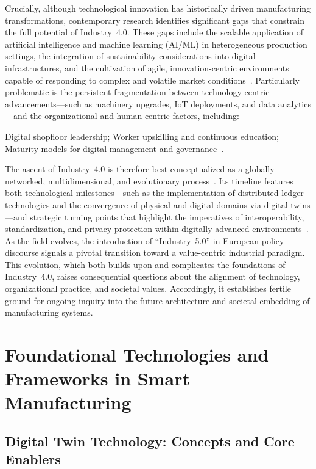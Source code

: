\documentclass[sigconf]{acmart}
\begin{document}
Crucially, although technological innovation has historically driven manufacturing transformations, contemporary research identifies significant gaps that constrain the full potential of Industry~4.0. These gaps include the scalable application of artificial intelligence and machine learning (AI/ML) in heterogeneous production settings, the integration of sustainability considerations into digital infrastructures, and the cultivation of agile, innovation-centric environments capable of responding to complex and volatile market conditions~\cite{ref41,ref63,ref86}. Particularly problematic is the persistent fragmentation between technology-centric advancements---such as machinery upgrades, IoT deployments, and data analytics---and the organizational and human-centric factors, including:

Digital shopfloor leadership;
Worker upskilling and continuous education;
Maturity models for digital management and governance~\cite{ref92}.

The ascent of Industry~4.0 is therefore best conceptualized as a globally networked, multidimensional, and evolutionary process~\cite{ref24}. Its timeline features both technological milestones---such as the implementation of distributed ledger technologies and the convergence of physical and digital domains via digital twins---and strategic turning points that highlight the imperatives of interoperability, standardization, and privacy protection within digitally advanced environments~\cite{ref67,ref91}. As the field evolves, the introduction of ``Industry~5.0'' in European policy discourse signals a pivotal transition toward a value-centric industrial paradigm. This evolution, which both builds upon and complicates the foundations of Industry~4.0, raises consequential questions about the alignment of technology, organizational practice, and societal values. Accordingly, it establishes fertile ground for ongoing inquiry into the future architecture and societal embedding of manufacturing systems.

\section{Foundational Technologies and Frameworks in Smart Manufacturing}

\subsection{Digital Twin Technology: Concepts and Core Enablers}
\end{document}
